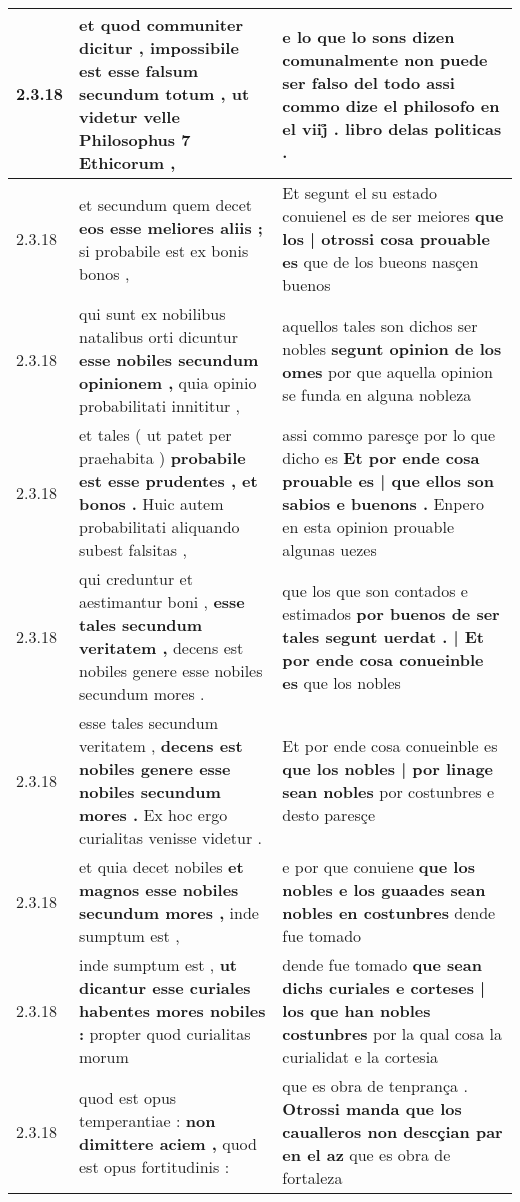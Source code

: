 \begin{tabular}{|p{1cm}|p{6.5cm}|p{6.5cm}|}
2.3.18 & et quod communiter dicitur , \textbf{ impossibile est esse falsum secundum totum , } ut videtur velle Philosophus 7 Ethicorum , & e lo que lo sons dizen comunalmente \textbf{ non puede ser falso del todo } assi commo dize el philosofo en el viij̊ . libro delas politicas . \\\hline
2.3.18 & et secundum quem decet \textbf{ eos esse meliores aliis ; } si probabile est ex bonis bonos , & Et segunt el su estado conuienel es de ser meiores \textbf{ que los | otrossi cosa prouable es } que de los bueons nasçen buenos \\\hline
2.3.18 & qui sunt ex nobilibus natalibus orti dicuntur \textbf{ esse nobiles secundum opinionem , } quia opinio probabilitati innititur , & aquellos tales son dichos ser nobles \textbf{ segunt opinion de los omes } por que aquella opinion se funda en alguna nobleza \\\hline
2.3.18 & et tales ( ut patet per praehabita ) \textbf{ probabile est esse prudentes , et bonos . } Huic autem probabilitati aliquando subest falsitas , & assi commo paresçe por lo que dicho es \textbf{ Et por ende cosa prouable es | que ellos son sabios e buenons . } Enpero en esta opinion prouable algunas uezes \\\hline
2.3.18 & qui creduntur et aestimantur boni , \textbf{ esse tales secundum veritatem , } decens est nobiles genere esse nobiles secundum mores . & que los que son contados e estimados \textbf{ por buenos de ser tales segunt uerdat . | Et por ende cosa conueinble es } que los nobles \\\hline
2.3.18 & esse tales secundum veritatem , \textbf{ decens est nobiles genere esse nobiles secundum mores . } Ex hoc ergo curialitas venisse videtur . & Et por ende cosa conueinble es \textbf{ que los nobles | por linage sean nobles } por costunbres e desto paresçe \\\hline
2.3.18 & et quia decet nobiles \textbf{ et magnos esse nobiles secundum mores , } inde sumptum est , & e por que conuiene \textbf{ que los nobles e los guaades sean nobles en costunbres } dende fue tomado \\\hline
2.3.18 & inde sumptum est , \textbf{ ut dicantur esse curiales habentes mores nobiles : } propter quod curialitas morum & dende fue tomado \textbf{ que sean dichs curiales e corteses | los que han nobles costunbres } por la qual cosa la curialidat e la cortesia \\\hline
2.3.18 & quod est opus temperantiae : \textbf{ non dimittere aciem , } quod est opus fortitudinis : & que es obra de tenprança . \textbf{ Otrossi manda que los caualleros non descçian par en el az } que es obra de fortaleza \\\hline

\end{tabular}

